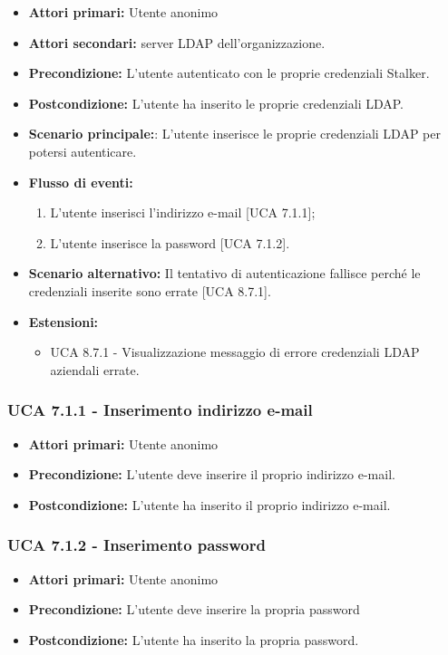 \begin{itemize}
	\item \textbf{Attori primari:} Utente anonimo 
	\item \textbf{Attori secondari:} server LDAP dell'organizzazione.
	\item \textbf{Precondizione:} L'utente  autenticato con le proprie credenziali Stalker.
	\item \textbf{Postcondizione:} L'utente ha inserito le proprie credenziali LDAP.
	\item \textbf{Scenario principale:}: L'utente inserisce le proprie credenziali LDAP per potersi autenticare.
	\item \textbf{Flusso di eventi:}
	\begin{enumerate}
		\item L'utente inserisci l'indirizzo e-mail [UCA 7.1.1];
		\item L'utente inserisce la password [UCA 7.1.2].
	\end{enumerate}
	\item \textbf{Scenario alternativo:} Il tentativo di autenticazione fallisce perché le credenziali inserite sono errate [UCA 8.7.1].
	\item \textbf{Estensioni:}
	\begin{itemize}
		\item UCA 8.7.1 - Visualizzazione messaggio di errore credenziali LDAP aziendali errate.
	\end{itemize}
\end{itemize}

\subsubsection{UCA 7.1.1 - Inserimento indirizzo e-mail}%
\begin{itemize}
	\item \textbf{Attori primari:} Utente anonimo
	\item \textbf{Precondizione:} L'utente deve inserire il proprio indirizzo e-mail.
	\item \textbf{Postcondizione:} L'utente ha inserito il proprio indirizzo e-mail.
\end{itemize}

\subsubsection{UCA 7.1.2 - Inserimento password}%
\begin{itemize}
	\item \textbf{Attori primari:} Utente anonimo
	\item \textbf{Precondizione:} L'utente deve inserire la propria password
	\item \textbf{Postcondizione:} L'utente ha inserito la propria password.
\end{itemize}

